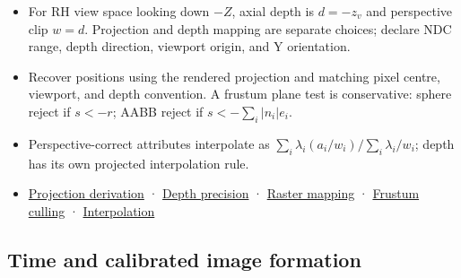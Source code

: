 \begin{itemize}
\tightlist
\item
  For RH view space looking down \(-Z\), axial depth is \(d=-z_v\) and perspective clip \(w=d\). Projection and depth mapping are separate choices; declare NDC range, depth direction, viewport origin, and Y orientation.
\item
  Recover positions using the rendered projection and matching pixel centre, viewport, and depth convention. A frustum plane test is conservative: sphere reject if \(s<-r\); AABB reject if \(s<-\sum_i|n_i|e_i\).
\item
  Perspective-correct attributes interpolate as \(\sum_i\lambda_i(a_i/w_i)/\sum_i\lambda_i/w_i\); depth has its own projected interpolation rule.
\item
  \href{Continuous\%20Notes/Computing\%20Foundations\%20-\%20From\%20Bits\%20to\%20C++\%20and\%20Systems\%20APIs\#Projection\%20turns\%20rays\%20into\%20clip\%20coordinates}{Projection derivation} · \href{Continuous\%20Notes/Computing\%20Foundations\%20-\%20From\%20Bits\%20to\%20C++\%20and\%20Systems\%20APIs\#Depth\%20is\%20a\%20numerical\%20design\%20choice}{Depth precision} · \href{Continuous\%20Notes/Computing\%20Foundations\%20-\%20From\%20Bits\%20to\%20C++\%20and\%20Systems\%20APIs\#A\%20projected\%20point\%20still\%20needs\%20a\%20raster\%20convention}{Raster mapping} · \href{Continuous\%20Notes/Computing\%20Foundations\%20-\%20From\%20Bits\%20to\%20C++\%20and\%20Systems\%20APIs\#The\%20viewing\%20volume\%20is\%20six\%20half-spaces}{Frustum culling} · \href{Continuous\%20Notes/Computing\%20Foundations\%20-\%20From\%20Bits\%20to\%20C++\%20and\%20Systems\%20APIs\#Raster\%20interpolation\%20remembers\%20homogeneous\%20depth}{Interpolation}
\end{itemize}

\subsection{Time and calibrated image formation}\label{time-and-calibrated-image-formation}

